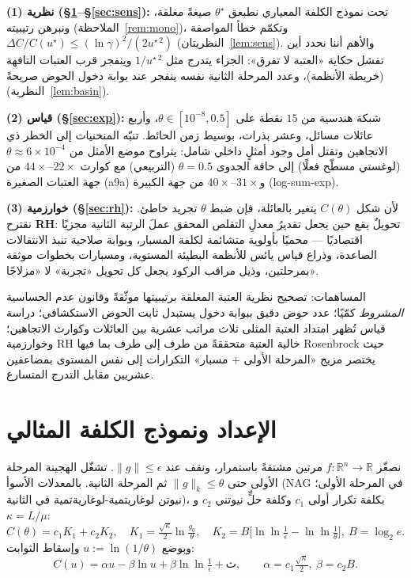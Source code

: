 ﻿\documentclass[12pt]{article}
\newcommand{\gnorm}{\lVert g\rVert}
\newcommand{\R}{\mathbb{R}}
\newcommand{\thetastar}{\theta^{\star}}
\begin{document}
\textbf{(1) نظرية (\S\ref{sec:model}--\S\ref{sec:sens}):} تحت نموذج
الكلفة المعياري نطبعق $\thetastar$ صيغةً مغلقة، ونبرهن رتيبيته
(الملاحظة~\ref{rem:mono})، ونكمّم خطأ المواصفة
$\Delta C/C(u^\star)\le(\ln\gamma)^2/(2u^{\star\,2})$
(النظريتان~\ref{lem:sens}). والأهم أننا نحدد أين تفشل حكاية «العتبة لا
تفرق»: الجزاء يتدرج مثل $1/u^{\star\,2}$ وينفجر قرب العتبات التافهة
(خريطة الأنظمة)، وعدد المرحلة الثانية نفسه ينفجر عند بوابة دخول الحوض
صريحةً (النظرية~\ref{lem:basin}).

\textbf{(2) قياس (\S\ref{sec:exp}):} شبكة هندسية من $15$ نقطة على
$\theta\in[10^{-8},0.5]$، وأربع عائلات مسائل، وعشر بذرات، بوسيط زمن
الحائط. تنبّه المنحنيات إلى الخطر ذي الاتجاهين وتقتل أمل وجود أمثلٍ
داخلي شامل: يتراوح موضع الأمثل من $\theta\approx6\times10^{-4}$
(لوغستي مسطّح فعلًا) إلى حافة الجدوى $\theta=0.5$ (التربيعي) مع كوارث
$22\times$--$44\times$ من جهة العتبات الصغيرة (a9a)
و$31\times$--$40\times$ من جهة الكبيرة (log-sum-exp).

\textbf{(3) خوارزمية (\S\ref{sec:rh}):} لأن شكل $C(\theta)$ يتغير
بالعائلة، فإن ضبط $\theta$ تجريد خاطئ. نقترح \textbf{RH}: تحويلٌ يقع
حين يجعل تقديرُ معدلِ التقلص المحقق عملَ الرتبة الثانية مجزيًا
اقتصاديًا --- محميًا بأولوية متشائمة لكلفة المسبار، وبوابة صلاحية
تنبذ الانتقالات الصاعدة، وذراع قياس يائس للأنظمة البطيئة المستوية،
ومسبارات بخطوات موثقة بمرحلتين، وذيل مراقب الركود يجعل كل تحويل
«تجربة» لا «مزلاجًا».

المساهمات: تصحيح نظرية العتبة المغلقة برتيبيتها موثّقةً وقانون عدم
الحساسية \emph{المشروط} كمّيًا؛ عدد حوض دقيق ببوابة دخول يستبدل ثابت
الحوض الاستكشافي؛ دراسة قياس تُظهر امتداد العتبة المثلى ثلاث مراتب
عشرية بين العائلات وكوارث الاتجاهين؛ وخوارزمية RH خالية العتبة
متحققةً من طرف إلى طرف بما فيها Rosenbrock حيث يختصر مزيج
«المرحلة الأولى + مسبار» التكرارات إلى نفس المستوى بمضاعفين عشريين
مقابل التدرج المتسارع.

\section{الإعداد ونموذج الكلفة المثالي}\label{sec:model}

نصغّر $f:\R^n\to\R$ مرتين مشتقةً باستمرار، ونقف عند
$\gnorm\le\epsilon$. تشغّل الهجينة المرحلة الأولى حتى
$\gnorm_k\le\theta$ ثم المرحلة الثانية. بالمعدلات الأسوأ (NAG في
المرحلة الأولى؛ نيوتن لوغاريتمية-لوغاريةتمية في الثانية)، بكلفة تكرار
أولى $c_1$ وكلفة حلٍّ نيوتني $c_2$ و$\kappa=L/\mu$:
\begin{equation}
C(\theta)=c_1K_1+c_2K_2,\quad
K_1=\tfrac{\sqrt\kappa}{2}\ln\tfrac{g_0}{\theta},\quad
K_2=B\bigl[\ln\ln\tfrac1\epsilon-\ln\ln\tfrac1\theta\bigr],\
B=\log_2 e .
\end{equation}
وبوضع $u:=\ln(1/\theta)$ وإسقاط الثوابت:
\begin{equation}\label{eq:Cu}
C(u)=\alpha u-\beta\ln u+\beta\ln\ln\tfrac1\epsilon+\text{ث},
\qquad \alpha=c_1\tfrac{\sqrt\kappa}{2},\ \beta=c_2B .
\end{equation}
\end{document}
